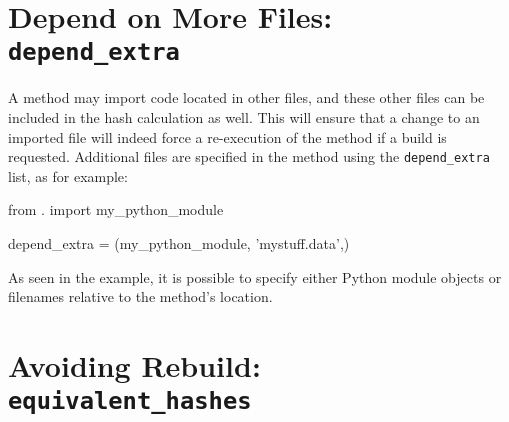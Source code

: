 \section{Depend on More Files:  \texttt{depend\_extra}}

A method may import code located in other files, and these other files
can be included in the hash calculation as well.  This will ensure
that a change to an imported file will indeed force a re-execution of
the method if a build is requested.  Additional files are specified in
the method using the \texttt{depend\_extra} list, as for example:
\begin{python}
from . import my_python_module

depend_extra = (my_python_module, 'mystuff.data',)
\end{python}
As seen in the example, it is possible to specify either Python module
objects or filenames relative to the method's location.



\section{Avoiding Rebuild: \texttt{equivalent\_hashes}}

